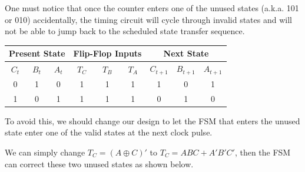 \documentclass[onecolumn, oneside, ctexart]{SUSTechHomework}
\begin{document}
\par One must notice that once the counter enters one of the unused states (a.k.a. 101 or 010) accidentally, the timing circuit will cycle through invalid states and will not be able to jump back to the scheduled state transfer sequence.
\begin{longtable}[c]{ccc|ccc|ccc}
\hline
\multicolumn{3}{c|}{Present State} & \multicolumn{3}{c|}{Flip-Flop Inputs} & \multicolumn{3}{c}{Next State}    \\ \hline
\endfirsthead
%
\endhead
%
$C_{t}$    & $B_{t}$   & $A_{t}$   & $T_C$       & $T_B$      & $T_A$      & $C_{t+1}$ & $B_{t+1}$ & $A_{t+1}$ \\ \hline
0          & 1         & 0         & 1           & 1          & 1          & 1         & 0         & 1         \\
1          & 0         & 1         & 1           & 1          & 1          & 0         & 1         & 0        \\ \hline
\end{longtable}

\par To avoid this, we should change our design to let the FSM that enters the unused state enter one of the valid states at the next clock pulse.
\par We can simply change $T_C=(A\oplus C)'$ to $T_C=ABC+A'B'C'$, then the FSM can correct these two unused states as shown below.

\pagebreak
\end{document}
